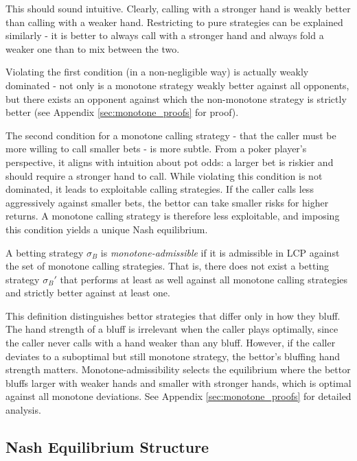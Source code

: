 \documentclass[../../main/main.tex]{subfiles}
\begin{document}
This should sound intuitive. Clearly, calling with a stronger hand is weakly better than calling with a weaker hand. Restricting to pure strategies can be explained similarly - it is better to always call with a stronger hand and always fold a weaker one than to mix between the two.

Violating the first condition (in a non-negligible way) is actually weakly dominated - not only is a monotone strategy weakly better against all opponents, but there exists an opponent against which the non-monotone strategy is strictly better (see Appendix \ref{sec:monotone_proofs} for proof).

The second condition for a monotone calling strategy - that the caller must be more willing to call smaller bets - is more subtle. From a poker player's perspective, it aligns with intuition about pot odds: a larger bet is riskier and should require a stronger hand to call. While violating this condition is not dominated, it leads to exploitable calling strategies. If the caller calls less aggressively against smaller bets, the bettor can take smaller risks for higher returns. A monotone calling strategy is therefore less exploitable, and imposing this condition yields a unique Nash equilibrium.

\begin{definition}
    A betting strategy $\sigma_B$ is \textit{monotone-admissible} if it is admissible in LCP against the set of monotone calling strategies. That is, there does not exist a betting strategy $\sigma_B'$ that performs at least as well against all monotone calling strategies and strictly better against at least one.
\end{definition}

This definition distinguishes bettor strategies that differ only in how they bluff. The hand strength of a bluff is irrelevant when the caller plays optimally, since the caller never calls with a hand weaker than any bluff. However, if the caller deviates to a suboptimal but still monotone strategy, the bettor's bluffing hand strength matters. Monotone-admissibility selects the equilibrium where the bettor bluffs larger with weaker hands and smaller with stronger hands, which is optimal against all monotone deviations. See Appendix \ref{sec:monotone_proofs} for detailed analysis.

\subsection{Nash Equilibrium Structure}
\label{subsec:nash_equilibrium_structure}
\end{document}
